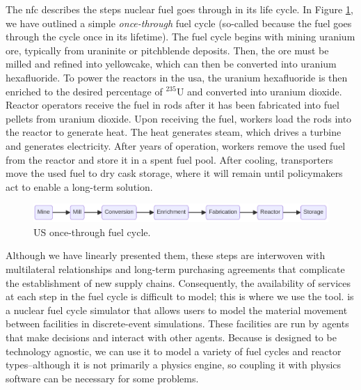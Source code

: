 The \gls{nfc} describes the steps nuclear fuel goes through
in its life cycle. In Figure \ref{fig:once-through}, we have outlined a
simple \textit{once-through} fuel cycle (so-called because the fuel goes through
the cycle once in its lifetime). The fuel cycle begins with mining uranium ore,
typically from uraninite or pitchblende deposits. Then, the ore must be milled
and refined into yellowcake, which can then be converted into uranium
hexafluoride. To power the reactors in the \gls{usa}, the uranium hexafluoride
is then enriched to the desired percentage of $^{235}$U and converted
into uranium dioxide. Reactor operators receive the fuel in rods after it has
been fabricated into fuel pellets from uranium dioxide. Upon receiving the
fuel, workers load the rods into the reactor to generate heat. The heat
generates steam, which drives a turbine and generates electricity. After years
of operation, workers remove the used fuel from the reactor and store it in a
spent fuel pool. After cooling, transporters move the used
fuel to dry cask storage, where it will remain until policymakers act to enable
a long-term solution.

\begin{figure}[H]
    \centering
    \includegraphics[scale=0.40]{images/once_through_fc.png}
    \caption{US once-through fuel cycle.}
    \label{fig:once-through}
\end{figure}

Although we have linearly presented them, these steps are interwoven with
multilateral relationships and long-term purchasing agreements that complicate
the establishment of new supply chains. Consequently, the availability of
services at each step in the fuel cycle is difficult to model; this is where we
use the \cyclus \cite{huff_cyclus_intro_2016} tool. \cyclus is a
nuclear fuel cycle simulator that allows users to model the material movement between facilities in discrete-event simulations. These facilities
are run by agents that make decisions and interact with other agents. Because
\cyclus is designed to be technology agnostic, we can use it to model a variety
of fuel cycles and reactor types--although it is not primarily a physics engine,
so coupling it with physics software can be necessary for some problems.

